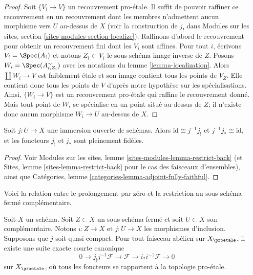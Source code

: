 \begin{proof}
Soit $\{V_i \to V\}$ un recouvrement pro-\'etale. Il suffit de pouvoir
raffiner ce recouvrement en un recouvrement dont les membres n'admettent aucun
morphisme vers $U$ au-dessus de $X$ (voir la construction de $j_!$ dans
Modules sur les sites, section \ref{sites-modules-section-localize}).
Raffinons d'abord le recouvrement pour obtenir un recouvrement fini dont les $V_i$ sont affines.
Pour tout $i$, écrivons $V_i = \Spec(A_i)$ et notons $Z_i \subset V_i$ le
sous-schéma image inverse de $Z$.
Posons $W_i = \Spec(A_{i, Z_i}^\sim)$ avec les notations du
lemme \ref{lemma-localization}.
Alors $\coprod W_i \to V$ est faiblement \'etale et son image contient tous les
points de $V_Z$. Elle contient donc tous les points de $V$ d'après
notre hypothèse sur les spécialisations. Ainsi, $\{W_i \to V\}$ est un
recouvrement pro-\'etale qui raffine le recouvrement donné. Mais tout point de $W_i$
se spécialise en un point situé au-dessus de $Z$; il n'existe donc aucun morphisme
$W_i \to U$ au-dessus de $X$.
\end{proof}

\begin{lemma}
\label{lemma-open-immersion}
Soit $j : U \to X$ une immersion ouverte de schémas.
Alors $\text{id} \cong j^{-1}j_!$ et $j^{-1}j_* \cong \text{id}$,
et les foncteurs $j_!$ et $j_*$ sont pleinement fidèles.
\end{lemma}

\begin{proof}
Voir Modules sur les sites, lemme \ref{sites-modules-lemma-restrict-back}
(et Sites, lemme \ref{sites-lemma-restrict-back} pour le cas
des faisceaux d'ensembles), ainsi que
Catégories, lemme \ref{categories-lemma-adjoint-fully-faithful}.
\end{proof}

\noindent
Voici la relation entre le prolongement par zéro et la restriction
au sous-schéma fermé complémentaire.

\begin{lemma}
\label{lemma-ses-associated-to-open}
Soit $X$ un schéma. Soit $Z \subset X$ un sous-schéma fermé et soit
$U \subset X$ son complémentaire. Notons $i : Z \to X$ et $j : U \to X$
les morphismes d'inclusion. Supposons que $j$ soit quasi-compact.
Pour tout faisceau abélien sur $X_\proetale$, il existe une suite exacte courte
canonique
$$
0 \to j_!j^{-1}\mathcal{F} \to \mathcal{F} \to i_*i^{-1}\mathcal{F} \to 0
$$
sur $X_\proetale$, où tous les foncteurs se rapportent à la topologie pro-\'etale.
\end{lemma}

